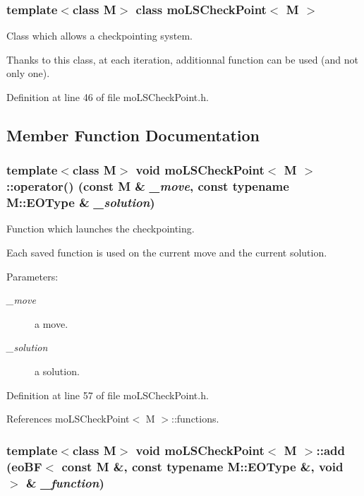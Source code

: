 \subsubsection*{template$<$class M$>$ class mo\-LSCheck\-Point$<$ M $>$}

Class which allows a checkpointing system. 

Thanks to this class, at each iteration, additionnal function can be used (and not only one). 



Definition at line 46 of file mo\-LSCheck\-Point.h.

\subsection{Member Function Documentation}
\subsubsection{\setlength{\rightskip}{0pt plus 5cm}template$<$class M$>$ void \bf{mo\-LSCheck\-Point}$<$ M $>$::operator() (const M \& {\em \_\-move}, const typename M::EOType \& {\em \_\-solution})\hspace{0.3cm}{\tt  [inline]}}\label{classmo_l_s_check_point_e9b9d41e40dd7bab648327686b2b938d}


Function which launches the checkpointing. 

Each saved function is used on the current move and the current solution.

\begin{Desc}
\item[Parameters:]
\begin{description}
\item[{\em \_\-move}]a move. \item[{\em \_\-solution}]a solution. \end{description}
\end{Desc}


Definition at line 57 of file mo\-LSCheck\-Point.h.

References mo\-LSCheck\-Point$<$ M $>$::functions.
\subsubsection{\setlength{\rightskip}{0pt plus 5cm}template$<$class M$>$ void \bf{mo\-LSCheck\-Point}$<$ M $>$::add (eo\-BF$<$ const M \&, const typename M::EOType \&, void $>$ \& {\em \_\-function})\hspace{0.3cm}{\tt  [inline]}}\label{classmo_l_s_check_point_f95f2dc556cdfbdc81688562ca95202d}


